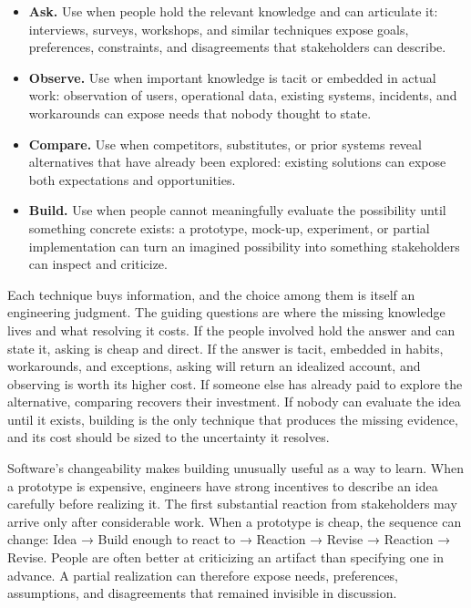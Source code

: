 \begin{itemize}
\tightlist
\item
  \textbf{Ask.} Use when people hold the relevant knowledge and can articulate it: interviews, surveys, workshops, and similar techniques expose goals, preferences, constraints, and disagreements that stakeholders can describe.
\item
  \textbf{Observe.} Use when important knowledge is tacit or embedded in actual work: observation of users, operational data, existing systems, incidents, and workarounds can expose needs that nobody thought to state.
\item
  \textbf{Compare.} Use when competitors, substitutes, or prior systems reveal alternatives that have already been explored: existing solutions can expose both expectations and opportunities.
\item
  \textbf{Build.} Use when people cannot meaningfully evaluate the possibility until something concrete exists: a prototype, mock-up, experiment, or partial implementation can turn an imagined possibility into something stakeholders can inspect and criticize.
\end{itemize}

Each technique buys information, and the choice among them is itself an engineering judgment. The
guiding questions are where the missing knowledge lives and what resolving it costs. If the people
involved hold the answer and can state it, asking is cheap and direct. If the answer is tacit,
embedded in habits, workarounds, and exceptions, asking will return an idealized account, and
observing is worth its higher cost. If someone else has already paid to explore the alternative,
comparing recovers their investment. If nobody can evaluate the idea until it exists, building is
the only technique that produces the missing evidence, and its cost should be sized to the
uncertainty it resolves.

Software's changeability makes building unusually useful as a way to learn. When a prototype is
expensive, engineers have strong incentives to describe an idea carefully before realizing it. The
first substantial reaction from stakeholders may arrive only after considerable work. When a
prototype is cheap, the sequence can change: Idea → Build enough to react to → Reaction → Revise →
Reaction → Revise. People are often better at criticizing an artifact than specifying one in
advance. A partial realization can therefore expose needs, preferences, assumptions, and
disagreements that remained invisible in discussion.

